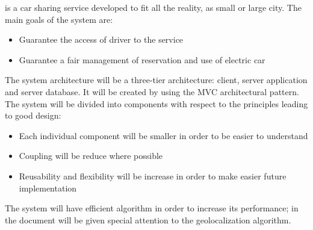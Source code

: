 \PowerEnJoy{} is a car sharing service developed to fit all the reality, as small or large city.
The main goals of the system are:
\begin{itemize}
	\item Guarantee the access of driver to the service
	\item Guarantee a fair management of reservation and use of electric car
\end{itemize}
The system architecture will be a three-tier architecture: client, server application and server database. It will be created by using the MVC architectural pattern.
The system will be divided into components with respect to the principles leading to good design:
\begin{itemize}
	\item Each individual component will be smaller in order to be easier to understand
	\item Coupling will be reduce where possible
	\item Reusability and flexibility will be increase in order to make easier future implementation
\end{itemize}
The system will have efficient algorithm in order to increase its performance;
in the document will be given special attention to the geolocalization algorithm.
